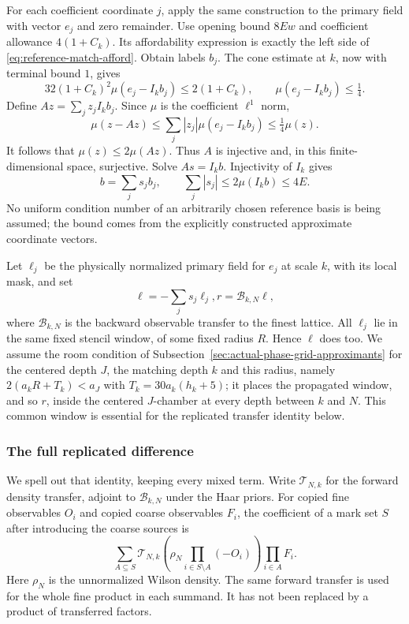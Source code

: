 For each coefficient coordinate $j$, apply the same construction
to the primary field with vector $e_j$ and zero remainder.
Use opening bound $8Ew$ and coefficient allowance $4(1+C_k)$.
Its affordability expression is exactly the left side of
\eqref{eq:reference-match-afford}. Obtain labels $b_j$.
The cone estimate at $k$, now with terminal bound $1$, gives
\[
 32(1+C_k)^2\mu(e_j-I_kb_j)\le2(1+C_k),
 \qquad \mu(e_j-I_kb_j)\le\tfrac14.
\]
Define $A z=\sum_jz_jI_kb_j$. Since $\mu$ is the coefficient
$\ell^1$ norm,
\[
 \mu(z-Az)\le\sum_j|z_j|\mu(e_j-I_kb_j)
                         \le\tfrac14\mu(z).
\]
It follows that $\mu(z)\le2\mu(Az)$. Thus $A$ is injective
and, in this finite-dimensional space, surjective. Solve
$As=I_kb$. Injectivity of $I_k$ gives
\begin{equation}\label{eq:reference-basis-expansion}
                   b=\sum_js_jb_j,
             \qquad\sum_j|s_j|\le2\mu(I_kb)\le4E.
\end{equation}
No uniform condition number of an arbitrarily chosen reference
basis is being assumed; the bound comes from the explicitly
constructed approximate coordinate vectors.

Let $\ell_j$ be the physically normalized primary field for
$e_j$ at scale $k$, with its local mask, and set
\[
                   \ell=-\sum_js_j\ell_j,
                         r=\mathcal B_{k,N}\ell,
\]
where $\mathcal B_{k,N}$ is the backward observable transfer to
the finest lattice. All $\ell_j$ lie in the same fixed stencil
window, of some fixed radius $R$. Hence $\ell$ does too. We assume
the room condition of Subsection~\ref{sec:actual-phase-grid-approximants}
for the centered depth $J$, the matching depth $k$ and this radius,
namely $2(a_kR+T_k)<a_J$ with $T_k=30a_k(h_k+5)$; it places the
propagated window, and so $r$, inside the centered $J$-chamber at every
depth between $k$ and $N$. This common window is essential
for the replicated transfer identity below.

\subsubsection{The full replicated difference}
We spell out that identity, keeping every mixed term. Write
$\mathcal T_{N,k}$ for the forward density transfer, adjoint to
$\mathcal B_{k,N}$ under the Haar priors. For copied fine
observables $O_i$ and copied coarse observables $F_i$, the
coefficient of a mark set $S$ after introducing the coarse
sources is
\begin{equation}\label{eq:reference-join}
 \sum_{A\subseteq S}
       \mathcal T_{N,k}\left(\rho_N
                    \prod_{i\in S\setminus A}(-O_i)\right)
                                      \prod_{i\in A}F_i.
\end{equation}
Here $\rho_N$ is the unnormalized Wilson density. The same
forward transfer is used for the whole fine product in each
summand. It has not been replaced by a product of transferred
factors.

